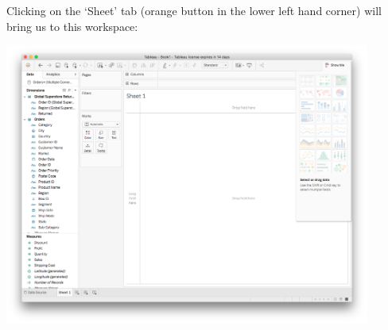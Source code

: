 \documentclass[xcolor=svgnames]{beamer} %
\begin{document}
\begin{frame}
Clicking on the `Sheet' tab (orange button in the lower left hand corner) will bring us to this workspace:
\begin{center}
\includegraphics[width=0.9\textwidth]{img/workspace}
\end{center}
\end{frame}
\end{document}
